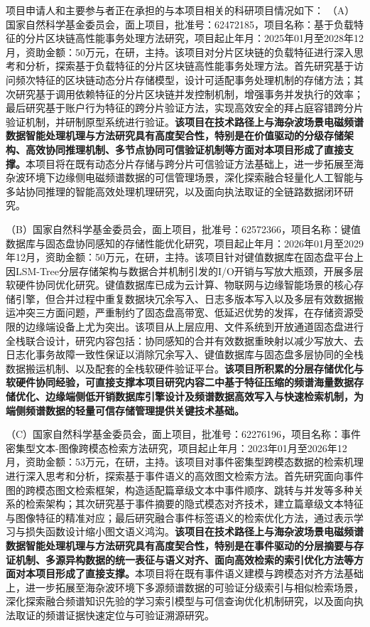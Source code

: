 {\kaishu


项目申请人和主要参与者正在承担的与本项目相关的科研项目情况如下：\newline
（A）国家自然科学基金委员会，面上项目，批准号：62472185，项目名称：基于负载特征的分片区块链高性能事务处理方法研究，项目起止年月：2025年01月至2028年12月，资助金额：50万元，在研，主持。该项目对分片区块链的负载特征进行深入思考和分析，探索基于负载特征的分片区块链高性能事务处理方法。首先研究基于访问频次特征的区块链动态分片存储模型，设计可适配事务处理机制的存储方法；其次研究基于调用依赖特征的分片区块链并发控制机制，增强事务并发执行的效率；最后研究基于账户行为特征的跨分片验证方法，实现高效安全的拜占庭容错跨分片验证机制，并研制原型系统进行验证。\textbf{该项目在技术路径上与海杂波场景电磁频谱数据智能处理机理与方法研究具有高度契合性，特别是在价值驱动的分级存储架构、高效协同推理机制、多节点协同可信验证机制等方面对本项目形成了直接支撑。}本项目将在既有动态分片存储与跨分片可信验证方法基础上，进一步拓展至海杂波环境下边缘侧电磁频谱数据的可信管理场景，深化探索融合轻量化人工智能与多站协同推理的智能高效处理机理研究，以及面向执法取证的全链路数据闭环研究。

（B）国家自然科学基金委员会，面上项目，批准号：62572366，项目名称：键值数据库与固态盘协同感知的存储性能优化研究，项目起止年月：2026年01月至2029年12月，资助金额：50万元，在研，主持。该项目针对键值数据库在固态盘平台上因LSM-Tree分层存储架构与数据合并机制引发的I/O开销与写放大瓶颈，开展多层软硬件协同优化研究。键值数据库已成为云计算、物联网与边缘智能场景的核心存储引擎，但合并过程中重复数据块冗余写入、日志多版本写入以及多层有效数据搬运冲突三方面问题，严重制约了固态盘高带宽、低延迟优势的发挥，在存储资源受限的边缘端设备上尤为突出。该项目从上层应用、文件系统到开放通道固态盘进行全栈联合设计，研究内容包括：协同感知的合并有效数据重映射以减少写放大、去日志化事务故障一致性保证以消除冗余写入、键值数据库与固态盘多层协同的全栈数据搬运机制、以及配套的全栈软硬件验证平台。\textbf{该项目所积累的分层存储优化与软硬件协同经验，可直接支撑本项目研究内容二中基于特征压缩的频谱海量数据存储优化、边缘端侧低开销数据库引擎设计及频谱数据高效写入与快速检索机制，为端侧频谱数据的轻量可信存储管理提供关键技术基础。}

（C）国家自然科学基金委员会，面上项目，批准号：62276196，项目名称：事件密集型文本-图像跨模态检索方法研究，项目起止年月：2023年01月至2026年12月，资助金额：53万元，在研，主持。该项目对事件密集型跨模态数据的检索机理进行深入思考和分析，探索基于事件语义的高效图文检索方法。首先研究面向事件图的跨模态图文检索框架，构造适配篇章级文本中事件顺序、跳转与并发等多种关系的检索架构；其次研究基于事件摘要的隐式模态对齐技术，建立篇章级文本特征与图像特征的精准对应；最后研究融合事件标签语义的检索优化方法，通过表示学习与损失函数设计缩小图文语义鸿沟。\textbf{该项目在技术路径上与海杂波场景电磁频谱数据智能处理机理与方法研究具有高度契合性，特别是在事件驱动的分层摘要与存证机制、多源异构数据的统一表征与语义对齐、面向高效检索的索引优化方法等方面对本项目形成了直接支撑。}本项目将在既有事件语义建模与跨模态对齐方法基础上，进一步拓展至海杂波环境下多源频谱数据的可验证分级索引与相似检索场景，深化探索融合频谱知识先验的学习索引模型与可信查询优化机制研究，以及面向执法取证的频谱证据快速定位与可验证溯源研究。

}

